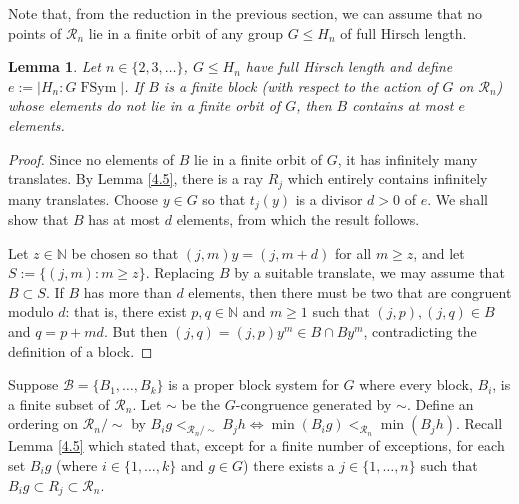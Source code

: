 \documentclass[11pt,a4paper]{amsart}
\newtheorem{lemma}[theorem]{Lemma}
\theoremstyle{definition}
\theoremstyle{remark}
\newcommand{\FSym}{\operatorname{FSym}}
\newcommand{\N}{\mathbb N}
\newcommand{\Ra}{\mathcal{R}}
\begin{document}
Note that, from the reduction in the previous section, we can assume that no points of $\Ra_n$ lie in a finite orbit of any group $G\le H_n$ of full Hirsch length.

\begin{lemma}\label{4.6}
Let $n\in \{2, 3, \ldots\}$, $G\le H_n$ have full Hirsch length and define $e:=|H_n:G\FSym|$. If $B$ is a finite block (with respect to the action of $G$ on $\Ra_n$) whose elements do not lie in a finite orbit of $G$, then $B$ contains at most $e$ elements.
\end{lemma}
\begin{proof} 
Since no elements of $B$ lie in a finite orbit of $G$, it has infinitely many translates. By Lemma \ref{4.5}, there is a ray $R_j$ which entirely contains infinitely many translates. Choose $y\in G$ so that $t_j(y)$ is a divisor $d>0$ of $e$. We shall show that $B$ has at most $d$ elements, from which the result follows.

Let $z\in \N$ be chosen so that $(j, m)y=(j, m+d)$ for all $m\ge z$, and let $S:=\{(j, m) : m\ge z\}$. Replacing $B$ by a suitable translate, we may assume that $B\subset S$. If $B$ has more than $d$ elements, then there must be two that are congruent modulo $d$: that is, there exist $p, q\in \N$ and $m\ge1$ such that $(j, p), (j, q)\in B$ and $q=p+md$. But then $(j, q)=(j, p)y^m\in B\cap By^m$, contradicting the definition of a block.
\end{proof}

Suppose $\mathcal{B} = \{ B_1, \ldots, B_k\}$ is a proper block system  for $G$ where every block, $B_i$, is a finite subset of $\Ra_n$. Let $\sim$ be the $G$-congruence generated by $\sim$. Define an ordering on $\Ra_n/\sim$ by $B_ig<_{\Ra_n/\sim} B_jh \Leftrightarrow \min(B_ig)<_{\Ra_n} \min(B_jh)$. Recall Lemma \ref{4.5} which stated that, except for a finite number of exceptions, for each set $B_ig$ (where $i\in \{1, \ldots, k\}$ and $g\in G$) there exists a $j\in \{1, \ldots, n\}$ such that $B_ig\subset R_j\subset \Ra_n$.
\end{document}
